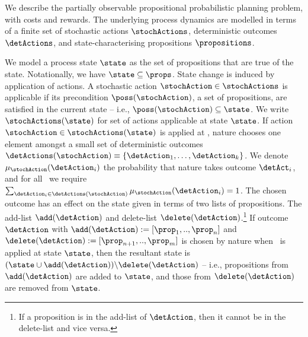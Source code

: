 

We describe the partially observable propositional probabilistic
planning problem, with costs and rewards. The underlying process
dynamics are modelled in terms of a finite set of stochastic actions
$\stochActions$, deterministic outcomes $\detActions$, and
state-characterising propositions $\propositions$.

We model a process state $\state$ as the set of propositions that are
true of the state. Notationally, we have $\state \subseteq
\props$. State change is induced by application of actions. A
stochastic action $\stochAction \in \stochActions$ is applicable if
its precondition $\poss(\stochAction)$, a set of propositions, are
satisfied in the current state -- i.e., $\poss(\stochAction) \subseteq
\state$. We write $\stochActions(\state)$ for set of actions
applicable at state $\state$.  If action $\stochAction \in
\stochActions(\state)$ is applied at \state, nature chooses one
element amongst a small set of deterministic outcomes
$\detActions(\stochAction) \equiv \{\detAction_1, \ldots, \detAction_k
\}$. We denote $\mu_{\stochAction}(\detAction_i)$ the probability that
nature takes outcome $\detAct_i$, and for all \stochAction\ we require
$\sum_{\detAction_i \in \detActions(\stochAction)}
\mu_{\stochAction}(\detAction_i) = 1$. The chosen outcome has an
effect on the state given in terms of two lists of propositions. The
add-list $\add(\detAction)$ and delete-list
$\delete(\detAction)$.\footnote{If a proposition is in the add-list of
$\detAction$, then it cannot be in the delete-list and vice versa.}
If outcome $\detAction$ with $\add(\detAction) := [\prop_1,
..,\prop_n]$ and $\delete(\detAction) := [\prop_{n+1},
..,\prop_m]$ is chosen by nature when \stochAction\ is
applied at state $\state$, then the resultant state is $ ( \state \cup
\add(\detAction) ) \backslash \delete(\detAction)$ -- i.e.,
propositions from $\add(\detAction)$ are added to $\state$, and those
from $\delete(\detAction)$ are removed from $\state$.

